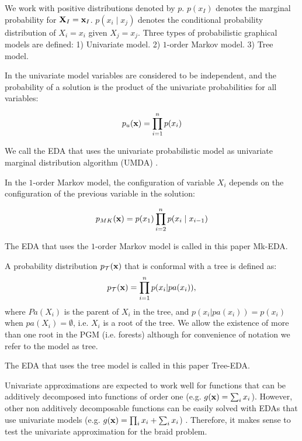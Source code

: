  We work  with positive distributions denoted by $p$. $p(x_I)$ denotes  the  marginal probability for ${\bf{X}}_I={\bf{x}}_I$.   $p(x_i \mid x_j)$ denotes the conditional probability distribution of $X_i=x_i$ given $X_j=x_j$. Three types of probabilistic graphical models are defined: 1) Univariate model. 2) $1$-order Markov model. 3) Tree model. 


In the univariate model variables are considered to be independent, and the probability of a solution is the product of the univariate probabilities for all variables:

\begin{equation}
 p_{u}({\bf{x}}) =   \prod_{i=1}^{n}  p(x_{i}) \label{eq:UNIV}
\end{equation}

We call the EDA that uses the univariate probabilistic model as univariate marginal distribution algorithm (UMDA) \cite{Muhlenbein_and_Paas:1996r}. 

In the $1$-order Markov model, the configuration of variable $X_i$ depends on the configuration of the previous variable in the solution:

\begin{equation}
 p_{MK}({\bf{x}}) =  p(x_{1})  \prod_{i=2}^{n}  p(x_{i} \mid  {x_{i-1}}) \label{eq:MKFACT}
\end{equation}

The EDA that uses the  $1$-order Markov model is called in this paper Mk-EDA. 

  A probability distribution $p_{\mathcal{T}}({\bf x})$ that is conformal with a tree is defined as:
\begin{equation}
  p_{\mathcal{T}} ({\bf{x}}) =\prod_{i=1}^{n} p(x_i|pa(x_i)),
\end{equation}
 where $Pa(X_i)$  is the parent of $X_i$ in the tree, and $p(x_i|pa(x_i))=p(x_i)$ when $pa(X_i)=\emptyset$, i.e. $X_i$ is a root of the tree. We allow the existence of more than one root in the PGM (i.e. forests) although for convenience of notation we refer to the model as tree. 
 
The EDA that uses the  tree model is called in this paper Tree-EDA.

 Univariate approximations are expected to work well for functions that can be additively decomposed into  functions of order one (e.g. $g({\bf{x}})= \sum_i x_i$). However, other non additively decomposable functions can be easily solved with EDAs that use univariate models (e.g. $g({\bf{x}})=   \prod_i x_i + \sum_i x_i $) \cite{Muhlenbein_et_al:1999}. Therefore, it makes sense to test the univariate approximation for the braid problem.  



